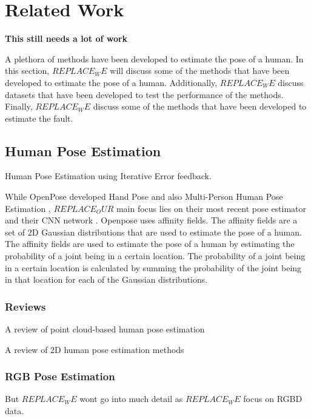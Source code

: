 \section{Related Work}
\label{sec:related_work}

\textbf{This still needs a lot of work}


A plethora of methods have been developed to estimate the pose of a human. In this section, $REPLACE_WE$ will discuss some of the methods that have been developed to estimate the pose of a human. Additionally, $REPLACE_WE$ discuss datasets that have been developed to test the performance of the methods. Finally, $REPLACE_WE$ discuss some of the methods that have been developed to estimate the fault.

\subsection{Human Pose Estimation}


Human Pose Estimation using Iterative Error feedback. \cite{IterativeErrorFeedback}

While OpenPose developed Hand Pose\cite{OpenPoseHand} and also Multi-Person Human Pose Estimation \cite{OpenPoseMulti}, $REPLACE_OUR$ main focus lies on their most recent pose estimator \cite{OpenPosePose} and their CNN network \cite{OpenPoseCNN}. Openpose uses affinity fields. The affinity fields are a set of 2D Gaussian distributions that are used to estimate the pose of a human. The affinity fields are used to estimate the pose of a human by estimating the probability of a joint being in a certain location. The probability of a joint being in a certain location is calculated by summing the probability of the joint being in that location for each of the Gaussian distributions.

\subsubsection{Reviews}


A review of point cloud-based human pose estimation \cite{ReviewPointcloudHPE}

A review of 2D human pose estimation methods \cite{ReviewHPE}

\subsubsection{RGB Pose Estimation}

But $REPLACE_WE$ wont go into much detail as $REPLACE_WE$ focus on RGBD data.

